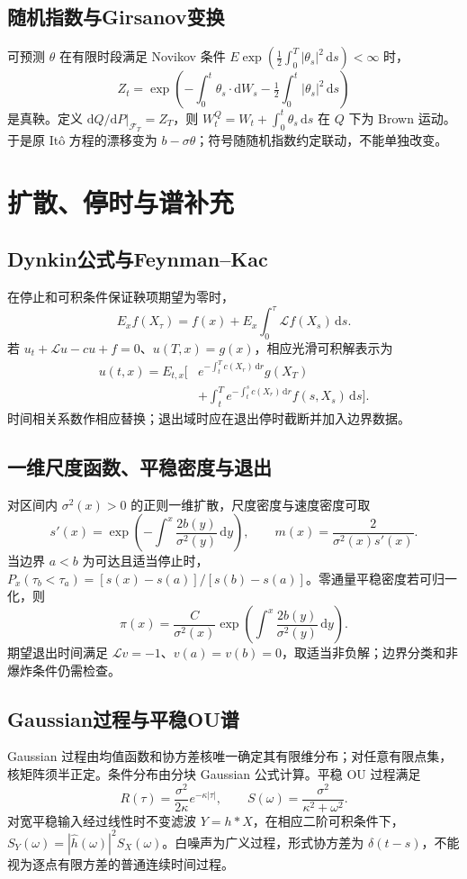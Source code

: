 \documentclass[../main.tex]{subfiles}
\begin{document}
\subsection{随机指数与Girsanov变换}
可预测 $\theta$ 在有限时段满足 Novikov 条件 $E\exp(\tfrac12\int_0^T|\theta_s|^2\,\mathrm ds)<\infty$ 时，
\[
Z_t=\exp\left(-\int_0^t\theta_s\cdot\mathrm dW_s-\tfrac12\int_0^t|\theta_s|^2\,\mathrm ds\right)
\]
是真鞅。定义 $\mathrm dQ/\mathrm dP|_{\mathcal F_T}=Z_T$，则 $W_t^Q=W_t+\int_0^t\theta_s\,\mathrm ds$ 在 $Q$ 下为 Brown 运动。于是原 Itô 方程的漂移变为 $b-\sigma\theta$；符号随随机指数约定联动，不能单独改变。
\section{扩散、停时与谱补充}
\subsection{Dynkin公式与Feynman--Kac}
在停止和可积条件保证鞅项期望为零时，
\[
E_xf(X_\tau)=f(x)+E_x\int_0^\tau\mathcal Lf(X_s)\,\mathrm ds.
\]
若 $u_t+\mathcal Lu-cu+f=0$、$u(T,x)=g(x)$，相应光滑可积解表示为
\begin{align*}
u(t,x)=E_{t,x}\bigg[&e^{-\int_t^Tc(X_r)\,\mathrm dr}g(X_T)\\
&+\int_t^Te^{-\int_t^sc(X_r)\,\mathrm dr}f(s,X_s)\,\mathrm ds\bigg].
\end{align*}
时间相关系数作相应替换；退出域时应在退出停时截断并加入边界数据。
\subsection{一维尺度函数、平稳密度与退出}
对区间内 $\sigma^2(x)>0$ 的正则一维扩散，尺度密度与速度密度可取
\[
s'(x)=\exp\left(-\int^x\frac{2b(y)}{\sigma^2(y)}\,\mathrm dy\right),\qquad
m(x)=\frac2{\sigma^2(x)s'(x)}.
\]
当边界 $a<b$ 为可达且适当停止时，$P_x(\tau_b<\tau_a)=[s(x)-s(a)]/[s(b)-s(a)]$。零通量平稳密度若可归一化，则
\[
\pi(x)=\frac C{\sigma^2(x)}\exp\left(\int^x\frac{2b(y)}{\sigma^2(y)}\,\mathrm dy\right).
\]
期望退出时间满足 $\mathcal Lv=-1$、$v(a)=v(b)=0$，取适当非负解；边界分类和非爆炸条件仍需检查。
\subsection{Gaussian过程与平稳OU谱}
Gaussian 过程由均值函数和协方差核唯一确定其有限维分布；对任意有限点集，核矩阵须半正定。条件分布由分块 Gaussian 公式计算。平稳 OU 过程满足
\[
R(\tau)=\frac{\sigma^2}{2\kappa}e^{-\kappa|\tau|},\qquad
S(\omega)=\frac{\sigma^2}{\kappa^2+\omega^2}.
\]
对宽平稳输入经过线性时不变滤波 $Y=h*X$，在相应二阶可积条件下，$S_Y(\omega)=|\widehat h(\omega)|^2S_X(\omega)$。白噪声为广义过程，形式协方差为 $\delta(t-s)$，不能视为逐点有限方差的普通连续时间过程。
\end{document}

